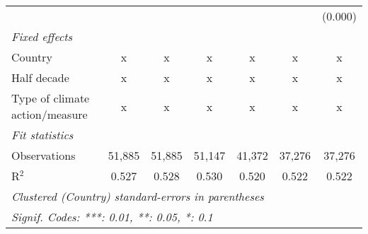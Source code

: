 \begin{tabular}{lcccccc}
                                                    &             &               &              &                &                & (0.000)\\   
   \emph{Fixed effects}\\
   Country                                          & x           & x             & x            & x              & x              & x\\  
   Half decade                                      & x           & x             & x            & x              & x              & x\\  
   Type of climate action/measure                   & x           & x             & x            & x              & x              & x\\  
   \midrule \emph{Fit statistics}\\
   Observations                                     & 51,885      & 51,885        & 51,147       & 41,372         & 37,276         & 37,276\\  
   R$^2$                                            & 0.527       & 0.528         & 0.530        & 0.520          & 0.522          & 0.522\\  
   \midrule
   \multicolumn{7}{l}{\emph{Clustered (Country) standard-errors in parentheses}}\\
   \multicolumn{7}{l}{\emph{Signif. Codes: ***: 0.01, **: 0.05, *: 0.1}}\\
\end{tabular}
\par\endgroup


